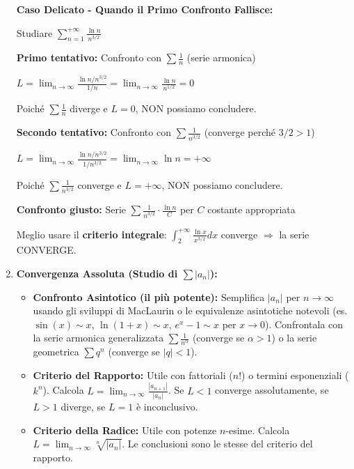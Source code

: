 \begin{enumerate}
    \begin{esempio}
    \textbf{Caso Delicato - Quando il Primo Confronto Fallisce:}
    
    Studiare $\sum_{n=1}^{+\infty} \frac{\ln n}{n^{3/2}}$
    
    \textbf{Primo tentativo:} Confronto con $\sum \frac{1}{n}$ (serie armonica)
    
    $L = \lim_{n \to \infty} \frac{\ln n / n^{3/2}}{1/n} = \lim_{n \to \infty} \frac{\ln n}{n^{1/2}} = 0$
    
    Poiché $\sum \frac{1}{n}$ diverge e $L = 0$, NON possiamo concludere.
    
    \textbf{Secondo tentativo:} Confronto con $\sum \frac{1}{n^{3/2}}$ (converge perché $3/2 > 1$)
    
    $L = \lim_{n \to \infty} \frac{\ln n / n^{3/2}}{1/n^{3/2}} = \lim_{n \to \infty} \ln n = +\infty$
    
    Poiché $\sum \frac{1}{n^{3/2}}$ converge e $L = +\infty$, NON possiamo concludere.
    
    \textbf{Confronto giusto:} Serie $\sum \frac{1}{n^{3/2}} \cdot \frac{\ln n}{C}$ per $C$ costante appropriata
    
    Meglio usare il \textbf{criterio integrale}: $\int_2^{+\infty} \frac{\ln x}{x^{3/2}} dx$ converge $\Rightarrow$ la serie CONVERGE.
    \end{esempio}

    \item \textbf{Convergenza Assoluta (Studio di $\sum |a_n|$):} 
    \begin{itemize}
        \item \textbf{Confronto Asintotico (il più potente):} Semplifica $|a_n|$ per $n \to \infty$ usando gli sviluppi di MacLaurin o le equivalenze asintotiche notevoli (es. $\sin(x) \sim x$, $\ln(1+x) \sim x$, $e^x-1 \sim x$ per $x \to 0$). Confrontala con la serie armonica generalizzata $\sum \frac{1}{n^\alpha}$ (converge se $\alpha > 1$) o la serie geometrica $\sum q^n$ (converge se $|q| < 1$). 
        \item \textbf{Criterio del Rapporto:} Utile con fattoriali ($n!$) o termini esponenziali ($k^n$). Calcola $L = \lim_{n \to \infty} \frac{|a_{n+1}|}{|a_n|}$. Se $L<1$ converge assolutamente, se $L>1$ diverge, se $L=1$ è inconclusivo. 
        \item \textbf{Criterio della Radice:} Utile con potenze $n$-esime. Calcola $L = \lim_{n \to \infty} \sqrt[n]{|a_n|}$. Le conclusioni sono le stesse del criterio del rapporto. 
    \end{itemize}
    

\end{enumerate}

